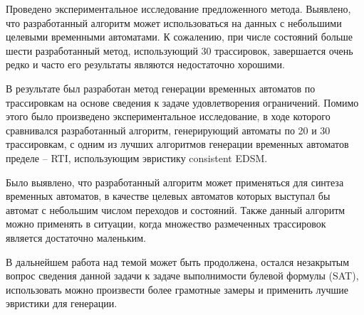 \documentclass[times,specification,annotation]{itmo-student-thesis}
\begin{document}
\begin{example}
\begin{figure}[!h]
\end{figure}
\end{example}

\chapterconclusion

Проведено экспериментальное исследование предложенного метода. Выявлено, что разработанный алгоритм может использоваться на данных с небольшими
целевыми временными автоматами. К сожалению, при числе состояний больше шести разработанный метод, использующий 30 трассировок, завершается очень редко
и часто его результаты являются недостаточно хорошими.

\startconclusionpage

В результате был разработан метод генерации временных автоматов по трассировкам на основе сведения к задаче удовлетворения ограничений.
Помимо этого было произведено экспериментальное исследование, в ходе которого сравнивался разработанный алгоритм, генерирующий автоматы по 20 и 30 трассировкам, 
с одним из лучших алгоритмов генерации временных автоматов пределе -- RTI, использующим эвристику consistent EDSM.

Было выявлено, что разработанный алгоритм может применяться для синтеза временных автоматов, в качестве целевых автоматов которых выступал бы автомат с
небольшим числом переходов и состояний. Также данный алгоритм можно применять в ситуации, когда множество размеченных трассировок является достаточно маленьким.

В дальнейшем работа над темой может быть продолжена, остался незакрытым вопрос сведения данной задачи к задаче выполнимости булевой формулы (SAT),
использовать 
можно произвести более грамотные замеры и применить лучшие эвристики для генерации.

\printmainbibliography

\appendix
\end{document}
